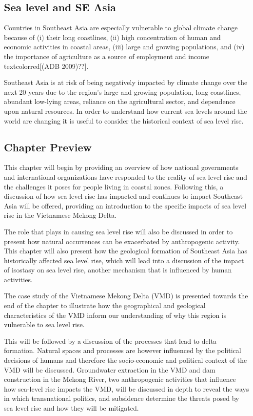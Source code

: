 \subsection{Sea level and SE Asia}
  
Countries in Southeast Asia are especially vulnerable to global climate change because of (i) their long coastlines, (ii) high concentration of human and economic activities in coastal areas, (iii) large and growing populations, and (iv) the importance of agriculture as a source of employment and income textcolor{red}{[(ADB 2009)??]}.

Southeast Asia is at risk of being negatively impacted by climate change over the next 20 years due to the region's large and growing  population, long coastlines, abundant low-lying areas, reliance on the agricultural sector, and dependence upon natural resources. In order to understand how current sea levels around the world are changing it is useful to consider the historical context of sea level rise. 

\subsection{Chapter Preview}

This chapter will begin by providing an overview of how national governments and international organizations have responded to the reality of sea level rise and the challenges it poses for people living in coastal zones. Following this, a discussion of how sea level rise has impacted and continues to impact Southeast Asia will be offered, providing an introduction to the specific impacts of sea level rise in the Vietnamese Mekong Delta. 

The role that \CO plays in causing sea level rise will also be discussed in order to present how natural occurrences can be exacerbated by anthropogenic activity. This chapter will also present how the geological formation of Southeast Asia has historically affected sea level rise, which will lead into a discussion of the impact of isostasy on sea level rise, another mechanism that is influenced by human activities.
 
The case study of the Vietnamese Mekong Delta (VMD) is presented towards the end of the chapter to illustrate how the geographical and geological characteristics of the VMD inform our understanding of why this region is vulnerable to sea level rise.
 
This will be followed by a discussion of the processes that lead to delta formation. Natural spaces and processes are however influenced by the political decisions of humans and therefore the socio-economic and political context of the VMD will be discussed. Groundwater extraction in the VMD and dam construction in the Mekong River, two anthropogenic activities that influence how sea-level rise impacts the VMD, will be discussed in depth to reveal the ways in which transnational politics, and subsidence determine the threats posed by sea level rise and how they will be mitigated.
  
